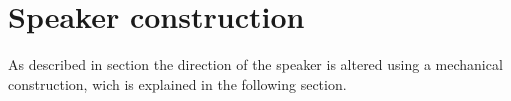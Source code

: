 \chapter{Speaker construction}
%
As described in section  the direction of the speaker is altered using a mechanical construction, wich is explained in the following section.
%


